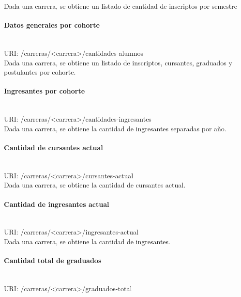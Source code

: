 Dada una carrera, se obtiene un listado de cantidad de inscriptos por semestre


\paragraph{Datos generales por cohorte}\mbox{}\\

URI: /carreras/<carrera>/cantidades-alumnos \\

Dada una carrera, se obtiene un listado de inscriptos, cursantes, graduados y postulantes por cohorte.


\paragraph{Ingresantes por cohorte}\mbox{}\\

URI: /carreras/<carrera>/cantidades-ingresantes \\

Dada una carrera, se obtiene la cantidad de ingresantes separadas por año.


\paragraph{Cantidad de cursantes actual}\mbox{}\\

URI: /carreras/<carrera>/cursantes-actual \\

Dada una carrera, se obtiene la cantidad de cursantes actual.


\paragraph{Cantidad de ingresantes actual}\mbox{}\\

URI: /carreras/<carrera>/ingresantes-actual \\

Dada una carrera, se obtiene la cantidad de ingresantes.


\paragraph{Cantidad total de graduados} \mbox{}\\

URI: /carreras/<carrera>/graduados-total \\

